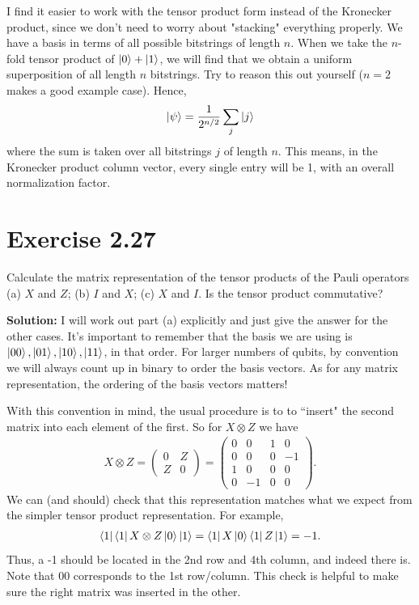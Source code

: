 \documentclass{book}
\begin{document}
    I find it easier to work with the tensor product form instead of the Kronecker product, since we don't need to worry about "stacking" everything properly. We have a basis in terms of all possible bitstrings of length $n$. When we take the $n$-fold tensor product of $\ket{0} + \ket{1}$, we will find that we obtain a uniform superposition of all length $n$ bitstrings. Try to reason this out yourself ($n = 2$ makes a good example case). Hence,
    \begin{align}
        \ket{\psi} = \frac{1}{2^{n/2}} \sum_j \ket{j}
    \end{align}
    where the sum is taken over all bitstrings $j$ of length $n$. This means, in the Kronecker product column vector, every single entry will be 1, with an overall normalization factor.

\section*{Exercise 2.27}
    Calculate the matrix representation of the tensor products of the Pauli operators (a) $X$ and $Z$; (b) $I$ and $X$; (c) $X$ and $I$. Is the tensor product commutative?
    
    \textbf{Solution:} I will work out part (a) explicitly and just give the answer for the other cases. It's important to remember that the basis we are using is $\ket{00}, \ket{01}, \ket{10}, \ket{11}$, in that order. For larger numbers of qubits, by convention we will always count up in binary to order the basis vectors. As for any matrix representation, the ordering of the basis vectors matters!
    
    With this convention in mind, the usual procedure is to to ``insert" the second matrix into each element of the first. So for $X\otimes Z$ we have
    \begin{align}
        X \otimes Z = \begin{pmatrix}
            0 & Z \\
            Z & 0
        \end{pmatrix} = \begin{pmatrix}
            0 & 0 & 1 & 0 \\
            0 & 0 & 0 & -1 \\
            1 & 0 & 0 & 0 \\
            0 & -1 & 0 & 0
        \end{pmatrix}.
    \end{align}
    We can (and should) check that this representation matches what we expect from the simpler tensor product representation. For example,
    \begin{align}
       \bra{1}\bra{1} X\otimes Z \ket{0}\ket{1} = \bra{1}X\ket{0} \bra{1}Z\ket{1} = -1.
    \end{align}
    Thus, a -1 should be located in the 2nd row and 4th column, and indeed there is. Note that $00$ corresponds to the 1st row/column. This check is helpful to make sure the right matrix was inserted in the other. 
    
\end{document}
